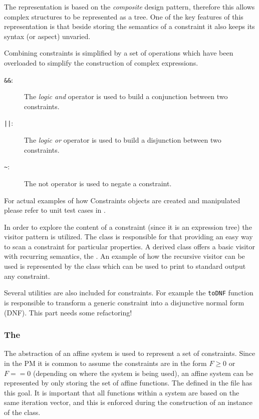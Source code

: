 The representation is based on the {\em composite} design pattern, therefore
this allows complex structures to be represented as a tree. One of the key
features of this representation is that beside storing the semantics of a
constraint it also keeps its syntax (or aspect) unvaried. 

Combining constraints is simplified by a set of operations which have been
overloaded to simplify the construction of complex expressions. 

\begin{description}

	\item[{\tt \&\&}:] The {\em logic and} operator is used to build a conjunction
		between two constraints. 

	\item[{\tt ||}:] The {\em logic or} operator is used to build a disjunction
		between two constraints. 

	\item[{\tt \textasciitilde{}}:] The not operator is used to negate a constraint. 

\end{description}

For actual examples of how Constraints objects are created and manipulated
please refer to unit test cases in
. 


In order to explore the content of a constraint (since it is an expression tree) the visitor
pattern is utilized. The class  is responsible for
that providing an easy way to scan a constraint for particular properties. A
derived class offers a basic visitor with recurring semantics, the
. An example of how the recursive visitor can be
used is represented by the  class which can be used
to print to standard output any constraint. 

Several utilities are also included for constraints. For example the {\tt toDNF}
function is responsible to transform a generic constraint into a disjunctive
normal form (DNF). This part needs some refactoring!

\subsubsection{The }

The abstraction of an affine system is used to represent a set of constraints.
Since in the PM it is common to assume the constraints are in the form $ F \ge
0$ or $F == 0$ (depending on where the system is being used), an affine system
can be represented by only storing the set of affine functions.  The
 defined in the file  has this
goal. It is important that all functions within a system are based on the same
iteration vector, and this is enforced during the construction of an instance of
the  class. 

